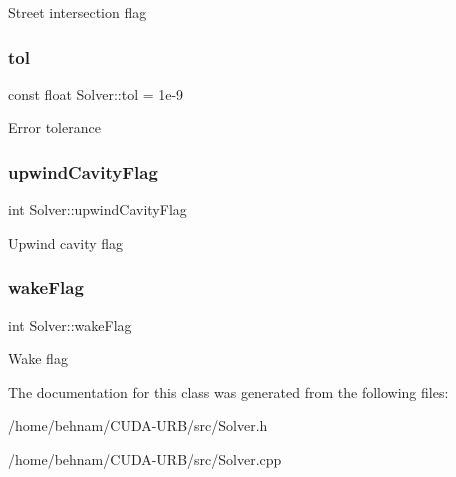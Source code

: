 Street intersection flag \mbox{\label{classSolver_aa97117b666a33e9a70963f0da7fbbcd5}} 
\subsubsection{\texorpdfstring{tol}{tol}}
{\footnotesize\ttfamily const float Solver\+::tol = 1e-\/9\hspace{0.3cm}{\ttfamily [protected]}}

Error tolerance \mbox{\label{classSolver_a597d486a292558f5f55db306eeec42d1}} 
\subsubsection{\texorpdfstring{upwind\+Cavity\+Flag}{upwindCavityFlag}}
{\footnotesize\ttfamily int Solver\+::upwind\+Cavity\+Flag\hspace{0.3cm}{\ttfamily [protected]}}

Upwind cavity flag \mbox{\label{classSolver_a5de7954b3723e984ef9c4963dfedcb04}} 
\subsubsection{\texorpdfstring{wake\+Flag}{wakeFlag}}
{\footnotesize\ttfamily int Solver\+::wake\+Flag\hspace{0.3cm}{\ttfamily [protected]}}

Wake flag 

The documentation for this class was generated from the following files\+:\begin{DoxyCompactItemize}
\item 
/home/behnam/\+C\+U\+D\+A-\/\+U\+R\+B/src/Solver.\+h\item 
/home/behnam/\+C\+U\+D\+A-\/\+U\+R\+B/src/Solver.\+cpp\end{DoxyCompactItemize}
